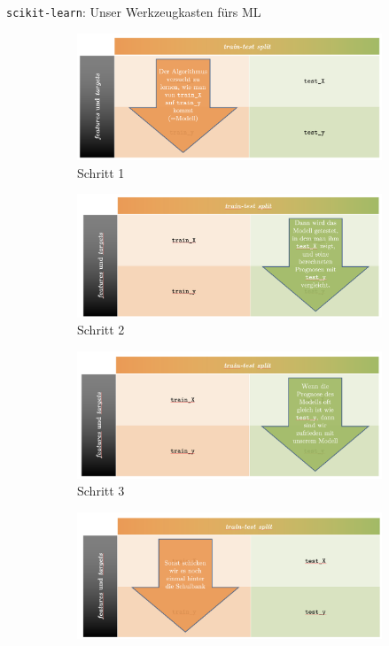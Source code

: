 \begin{lpu}{\texttt{scikit-learn}: Unser Werkzeugkasten fürs ML}
\begin{figure}[h!]
\centering
\begin{subfigure}[t]{0.45\textwidth}
  \includegraphics[width=\linewidth, valign=t]{testtrain_1.png}
  \caption{Schritt 1}
\end{subfigure}
\hfill
\begin{subfigure}[t]{0.45\textwidth}
  \includegraphics[width=\linewidth, valign=t]{testtrain_2.png}
  \caption{Schritt 2}
\end{subfigure}
\vspace{1em}
\begin{subfigure}[t]{0.45\textwidth}
  \includegraphics[width=\linewidth, valign=t]{testtrain_3.png}
  \caption{Schritt 3}
\end{subfigure}
\hfill
\begin{subfigure}[t]{0.45\textwidth}
  \includegraphics[width=\linewidth, valign=t]{testtrain_4.png}

\end{subfigure}
\end{figure}
\end{lpu}
